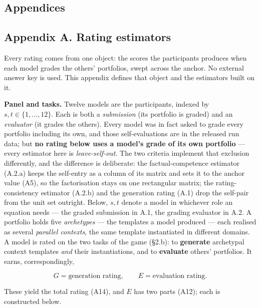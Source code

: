 \subsection{Appendices}\label{appendices}

\subsection{Appendix A. Rating estimators}\label{appendix-a.-rating-estimators}

Every rating comes from one object: the scores the participants produces when each model grades the others' portfolios, swept across the anchor. No external answer key is used. This appendix defines that object and the estimators built on it.

\textbf{Panel and tasks.} Twelve models are the participants, indexed by \(s,t\in\{1,\dots,12\}\). Each is both a \emph{submission} (its portfolio is graded) and an \emph{evaluator} (it grades the others). Every model was in fact asked to grade every portfolio including its own, and those self-evaluations are in the released run data; but \textbf{no rating below uses a model's grade of its own portfolio} --- every estimator here is \emph{leave-self-out}. The two criteria implement that exclusion differently, and the difference is deliberate: the factual-competence estimator (A.2.a) keeps the self-entry as a column of its matrix and sets it to the anchor value (A5), so the factorisation stays on one rectangular matrix; the rating-consistency estimator (A.2.b) and the generation rating (A.1) drop the self-pair from the unit set outright. Below, \(s,t\) denote a model in whichever role an equation needs --- the graded submission in A.1, the grading evaluator in A.2. A portfolio holds five \emph{archetypes} --- the templates a model produced --- each realised as several \emph{parallel contexts}, the same template instantiated in different domains. A model is rated on the two tasks of the game (§2.b): to \textbf{generate} archetypal context templates \emph{and} their instantiations, and to \textbf{evaluate} others' portfolios. It earns, correspondingly,

\[ G=\text{generation rating},\qquad E=\text{evaluation rating}. \tag{A1}\]

These yield the total rating (A14), and \(E\) has two parts (A12); each is constructed below.

